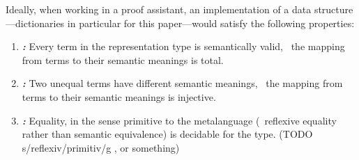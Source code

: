 



Ideally, when working in a proof assistant, an implementation of a data structure---dictionaries in particular for this paper---would satisfy the following properties:

\newcommand{\designGoal}[1]
  {\textbf{\emph{#1:}}}

\begin{enumerate}

\item
%
\designGoal{\SemTot}
%
Every term in the representation type is semantically valid, \ie{}~the mapping from terms to their semantic meanings is total.

\item
%
\designGoal{\SemInj}
%
Two unequal terms have different semantic meanings, \ie{}~the mapping from terms to their semantic meanings is injective.

\item
%
\designGoal{\EqDec}
%
Equality, in the sense primitive to the metalanguage (\ie{}~reflexive equality rather than semantic equivalence) is decidable for the type.
(TODO s/reflexiv/primitiv/g , or something)

\end{enumerate}

